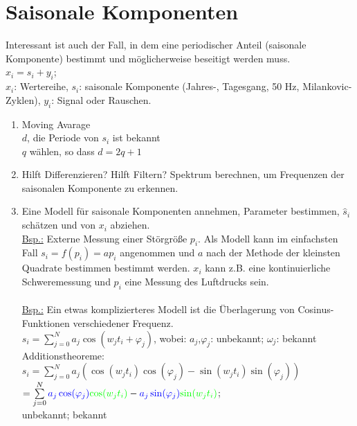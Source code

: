 \section{Saisonale Komponenten}
Interessant ist auch der Fall, in dem eine periodischer Anteil (saisonale Komponente) bestimmt und möglicherweise beseitigt werden muss.\\
$x_i=s_i + y_i$;\\
 $x_i$: Wertereihe, $s_i$: saisonale Komponente (Jahres-, Tagesgang, 50 Hz, Milankovic-Zyklen), $y_i$: Signal oder Rauschen.\\
\begin{enumerate}
\item Moving Avarage\\
$d$, die Periode von $s_i$ ist bekannt\\ $q$ wählen, so dass $d=2q+1$
\item Hilft Differenzieren? Hilft Filtern? Spektrum berechnen, um Frequenzen der saisonalen Komponente zu erkennen.
\item Eine Modell für saisonale Komponenten annehmen, Parameter bestimmen, $\hat s_i$ schätzen und von $x_i$ abziehen.\\
\underline{Bsp.:} Externe Messung einer Störgröße $p_i$. Als Modell kann im einfachsten Fall $s_i=f(p_i) = ap_i$ angenommen und $a$ nach der Methode der kleinsten Quadrate bestimmen bestimmt werden. $x_i$ kann z.B. eine kontinuierliche Schweremessung und $p_i$ eine Messung des Luftdrucks sein. \\
\\ \underline{Bsp.:} Ein etwas komplizierteres Modell ist die Überlagerung von Cosinus-Funktionen verschiedener Frequenz.\\
$s_i=\sum\limits_{j=0}^N a_j \cos(w_jt_i+\varphi_j)$, wobei: $a_j$,$\varphi_j$: unbekannt; $\omega_j$: bekannt\\
\hspace*{1cm} Additionstheoreme:\\
\hspace*{1.5cm} $s_i=\sum\limits_{j=0}^N a_j (\cos(w_jt_i)\cos(\varphi_j) - \sin(w_jt_i) \sin(\varphi_j))$\\
\hspace*{1.9cm} $=\sum\limits_{j=0}^N {\color{blue}a_j \cos(\varphi_j)} {\color{green}\cos(w_jt_i)} -{\color{blue}a_j \sin(\varphi_j)}{\color{green} \sin(w_jt_i)} $; \\ \hspace*{3cm} {\color{blue} unbekannt}; {\color{green} bekannt}\\

\end{enumerate}
